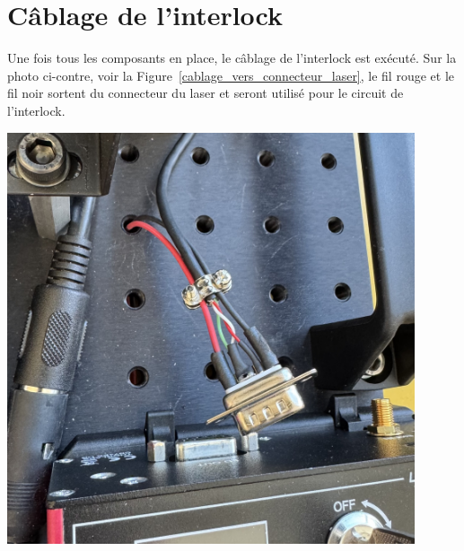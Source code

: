 \section{Câblage de l'interlock}
\begin{minipage}[c]{0.48\textwidth}
    Une fois tous les composants en place, le câblage de l'interlock est exécuté. Sur la photo ci-contre, voir la Figure~\ref{cablage_vers_connecteur_laser}, le fil rouge et le fil noir sortent du connecteur du laser et seront utilisé pour le circuit de l'interlock.
\end{minipage}\hfill
\begin{minipage}[c]{0.48\textwidth}
    \begin{center}
        \includegraphics[width=0.9\textwidth]{assets/figures/Protections_laser/Securite_electrique/cablage_vers_connecteur_laser.jpeg}
    \end{center}
    \label{cablage_vers_connecteur_laser}
\end{minipage}

